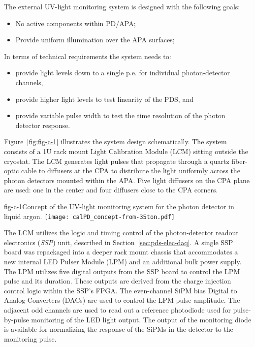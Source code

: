 The external UV-light monitoring system is designed with the following goals:
				
\begin{itemize}
\item No active components within PD/APA;
\item Provide uniform illumination over the APA surfaces;
\end{itemize}

In terms of technical requirements the system needs to:
\begin{itemize}
\item provide light levels down to a single p.e. for individual photon-detector channels,
\item provide higher light levels to test linearity of the PDS, and
\item provide variable pulse width to test the time resolution of the photon detector response.
\end{itemize}

Figure~\ref{fig:fig-c-1} illustrates the system design schematically. The system consists of a 1U rack mount Light Calibration Module (LCM) sitting outside the cryostat. The LCM generates light pulses that propagate through a quartz fiber-optic cable to diffusers at the CPA to distribute the light uniformly across the photon detectors mounted within the APA.  Five light 
diffusers on the CPA plane are used: one in the center and four diffusers close to the CPA corners. 
%
 \begin{cdrfigure}{fig-c-1}{Concept of the UV-light monitoring system for the photon detector in liquid argon.}
\texttt{[image: calPD\_concept-from-35ton.pdf]}
\end{cdrfigure}
%


The LCM utilizes the logic and timing control of the photon-detector readout electronics (\textit{SSP}) unit, described in Section~\ref{sec:pds-elec-daq}.  
A single SSP board was repackaged into a deeper rack mount chassis that accommodates a new internal 
LED Pulser Module (LPM) and an additional bulk power supply. The LPM utilizes five digital outputs from the SSP board to control the LPM pulse and its duration.  
These outputs are derived from the charge injection control logic within the SSP's FPGA.  
The even-channel SiPM bias Digital to Analog Converters (DACs)
are used to control the LPM pulse amplitude.  
The adjacent odd channels are used to read out a reference photodiode used for pulse-by-pulse monitoring of the LED light output.  
The output of the monitoring diode is available for normalizing 
the response of the SiPMs in the detector to the monitoring pulse.

